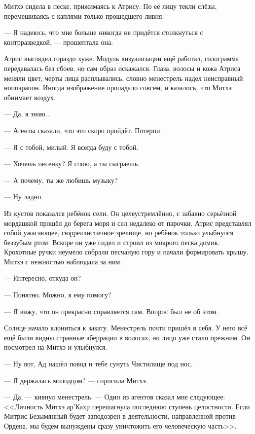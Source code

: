 Митхэ сидела в песке, прижимаясь к Атрису.
По её лицу текли слёзы, перемешиваясь с каплями только прошедшего ливня.

--- Я надеюсь, что мне больше никогда не придётся столкнуться с контрразведкой, --- прошептала она.

Атрис выглядел гораздо хуже.
Модуль визуализации ещё работал, голограмма передавалась без сбоев, но сам образ искажался.
Глаза, волосы и кожа Атриса меняли цвет, черты лица расплывались, словно менестрель надел неисправный ноппэрапон\FM.
Иногда изображение пропадало совсем, и казалось, что Митхэ обнимает воздух.

--- Да, я знаю...

--- Агенты сказали, что это скоро пройдёт.
Потерпи.

--- Я с тобой, милый.
Я всегда буду с тобой.

--- Хочешь песенку?
Я спою, а ты сыграешь.

--- А почему, ты же любишь музыку?

--- Ну ладно.

Из кустов показался ребёнок сели.
Он целеустремлённо, с забавно серьёзной мордашкой прошёл до берега моря и сел недалеко от парочки.
Атрис представлял собой ужасающее, сюрреалистичное зрелище, но ребёнок только улыбнулся беззубым ртом.
Вскоре он уже сидел и строил из мокрого песка домик.
Крохотные ручки неумело собрали песчаную гору и начали формировать крышу.
Митхэ с нежностью наблюдала за ним.

--- Интересно, откуда он?

--- Понятно.
Можно, я ему помогу?

--- Я вижу, что он прекрасно справляется сам.
Вопрос был не об этом.

Солнце начало клониться к закату.
Менестрель почти пришёл в себя.
У него всё ещё были видны странные аберрации в волосах, но лицо уже стало прежним.
Он посмотрел на Митхэ и улыбнулся.

--- Ну вот, Ад нашёл повод и тебе сунуть Чистилище под нос.

--- Я держалась молодцом? --- спросила Митхэ.

--- Да, --- кивнул менестрель.
--- Один из агентов сказал мне следующее: <<Личность Митхэ ар’Кахр перешагнула последнюю ступень целостности.
Если Митрис Безымянный будет заподозрен в деятельности, направленной против Ордена, мы будем вынуждены сразу уничтожить его человеческую часть>>.


